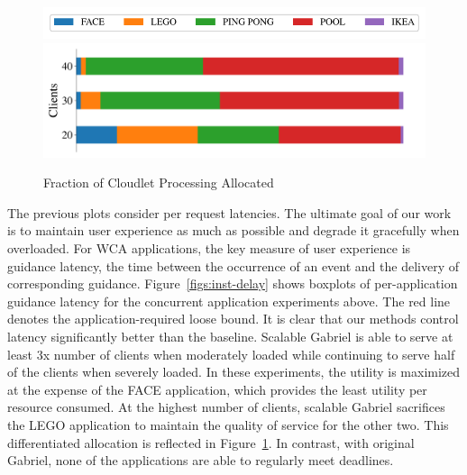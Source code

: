 \begin{figure}
	\begin{center}
		\includegraphics[width=\linewidth]{FIGS/fig-alloc-latency-legend.pdf}
		\includegraphics[width=\linewidth]{FIGS/fig-sec6-latency-allocation.pdf}
	\end{center}
\vspace{-0.1in}
	\caption{\small Fraction of Cloudlet Processing Allocated}
	\label{figs:resource-allocated}
\end{figure}

The previous plots consider per request latencies. The ultimate goal
of our work is to maintain user experience as much as possible and
degrade it gracefully when overloaded. For WCA applications, the key
measure of user experience is guidance latency, the time between the
occurrence of an event and the delivery of corresponding guidance.
Figure~\ref{figs:inst-delay} shows boxplots of per-application
guidance latency for the concurrent application experiments above. The
red line denotes the application-required loose bound. It is clear
that our methods control latency significantly better than the
baseline. Scalable Gabriel is able to serve at least 3x number of clients
when moderately loaded while continuing to serve half of the clients
when severely loaded. In these experiments, the utility is maximized
at the expense of the FACE application, which provides the least
utility per resource consumed. At the highest number of clients, scalable
Gabriel sacrifices the LEGO application to maintain the quality of service for
the other two. This differentiated allocation is reflected in
Figure~\ref{figs:resource-allocated}. In contrast, with original Gabriel,
none of the applications are able to regularly meet deadlines.









